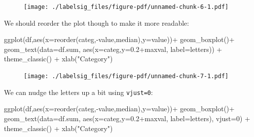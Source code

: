 \documentclass[
  letterpaper,
  DIV=11,
  numbers=noendperiod]{scrreprt}
\newenvironment{Shaded}{\begin{snugshade}}{\end{snugshade}}
\newcommand{\AttributeTok}[1]{\textcolor[rgb]{0.40,0.45,0.13}{#1}}
\newcommand{\DecValTok}[1]{\textcolor[rgb]{0.68,0.00,0.00}{#1}}
\newcommand{\FloatTok}[1]{\textcolor[rgb]{0.68,0.00,0.00}{#1}}
\newcommand{\FunctionTok}[1]{\textcolor[rgb]{0.28,0.35,0.67}{#1}}
\newcommand{\NormalTok}[1]{\textcolor[rgb]{0.00,0.23,0.31}{#1}}
\newcommand{\SpecialCharTok}[1]{\textcolor[rgb]{0.37,0.37,0.37}{#1}}
\newcommand{\StringTok}[1]{\textcolor[rgb]{0.13,0.47,0.30}{#1}}
\begin{document}
\begin{figure}[H]

{\centering \texttt{[image: ./labelsig\_files/figure-pdf/unnamed-chunk-6-1.pdf]}

}

\end{figure}

We should reorder the plot though to make it more readable:

\begin{Shaded}
\begin{Highlighting}[]
\FunctionTok{ggplot}\NormalTok{(df,}\FunctionTok{aes}\NormalTok{(}\AttributeTok{x=}\FunctionTok{reorder}\NormalTok{(categ,}\SpecialCharTok{{-}}\NormalTok{value,median),}\AttributeTok{y=}\NormalTok{value))}\SpecialCharTok{+}
  \FunctionTok{geom\_boxplot}\NormalTok{()}\SpecialCharTok{+}
  \FunctionTok{geom\_text}\NormalTok{(}\AttributeTok{data=}\NormalTok{df.sum,}
            \FunctionTok{aes}\NormalTok{(}\AttributeTok{x=}\NormalTok{categ,}\AttributeTok{y=}\FloatTok{0.2}\SpecialCharTok{+}\NormalTok{maxval,}
                \AttributeTok{label=}\NormalTok{letters)) }\SpecialCharTok{+}
  \FunctionTok{theme\_classic}\NormalTok{() }\SpecialCharTok{+}
  \FunctionTok{xlab}\NormalTok{(}\StringTok{"Category"}\NormalTok{)}
\end{Highlighting}
\end{Shaded}

\begin{figure}[H]

{\centering \texttt{[image: ./labelsig\_files/figure-pdf/unnamed-chunk-7-1.pdf]}

}

\end{figure}

We can nudge the letters up a bit using \texttt{vjust=0}:

\begin{Shaded}
\begin{Highlighting}[]
\FunctionTok{ggplot}\NormalTok{(df,}\FunctionTok{aes}\NormalTok{(}\AttributeTok{x=}\FunctionTok{reorder}\NormalTok{(categ,}\SpecialCharTok{{-}}\NormalTok{value,median),}\AttributeTok{y=}\NormalTok{value))}\SpecialCharTok{+}
  \FunctionTok{geom\_boxplot}\NormalTok{()}\SpecialCharTok{+}
  \FunctionTok{geom\_text}\NormalTok{(}\AttributeTok{data=}\NormalTok{df.sum,}
            \FunctionTok{aes}\NormalTok{(}\AttributeTok{x=}\NormalTok{categ,}\AttributeTok{y=}\FloatTok{0.2}\SpecialCharTok{+}\NormalTok{maxval,}
                \AttributeTok{label=}\NormalTok{letters), }\AttributeTok{vjust=}\DecValTok{0}\NormalTok{) }\SpecialCharTok{+}
  \FunctionTok{theme\_classic}\NormalTok{() }\SpecialCharTok{+}
  \FunctionTok{xlab}\NormalTok{(}\StringTok{"Category"}\NormalTok{)}
\end{Highlighting}
\end{Shaded}
\end{document}
